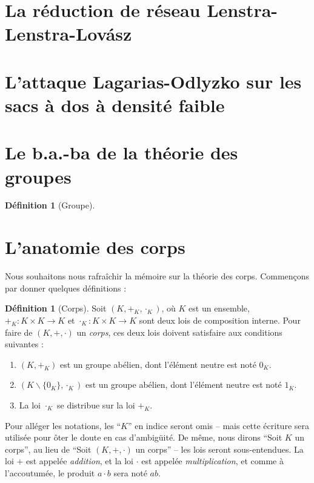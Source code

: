 \documentclass[a4paper, titlepage]{article}
\theoremstyle{definition}
\newtheorem{defi}[theo]{Définition}
\theoremstyle{remark}
\begin{document}
\section{La réduction de réseau Lenstra-Lenstra-Lov\'asz}

\section{L'attaque Lagarias-Odlyzko sur les sacs à dos à densité faible}

\newpage
\appendix

\section{Le b.a.-ba de la théorie des groupes}
\begin{defi}[Groupe]

\end{defi}

\section{L'anatomie des corps}

Nous souhaitons nous rafraîchir la mémoire sur la théorie des corps. Commençons par donner quelques définitions :

\begin{defi}[Corps]
Soit $(K,+_K,\cdot_K)$, où $K$ est un ensemble, $+_K : K \times K \rightarrow K$ et $\cdot_K: K \times K \rightarrow K$ sont deux lois de composition interne. Pour faire de $(K,+,\cdot)$ un \textit{corps}, ces deux lois doivent satisfaire aux conditions suivantes : \begin{enumerate}
\item $(K,+_K)$ est un groupe abélien, dont l'élément neutre est noté $0_K$.
\item $(K\backslash \{0_K\},\cdot_K)$ est un groupe abélien, dont l'élément neutre est noté $1_K$.
\item La loi $\cdot_K$ se distribue sur la loi $+_K$.
\end{enumerate}
\end{defi}

Pour alléger les notations, les ``$K$'' en indice seront omis -- mais cette écriture sera utilisée pour ôter le doute en cas d’ambigüité. De même, nous dirons ``Soit $K$ un corps'', au lieu de ``Soit $(K,+,\cdot)$ un corps'' -- les lois seront sous-entendues. La loi $+$ est appelée \textit{addition}, et la loi $\cdot$ est appelée \textit{multiplication}, et comme à l'accoutumée, le produit $a\cdot b$ sera noté $ab$.
\end{document}
